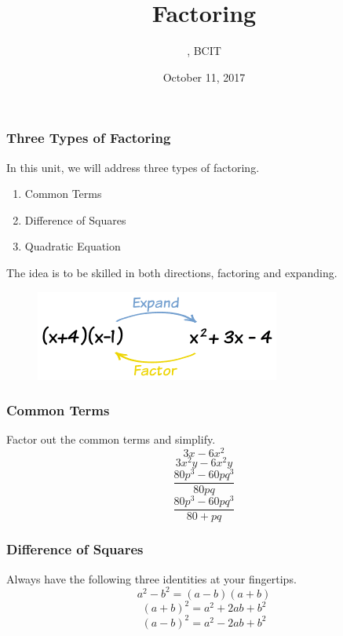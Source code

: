 \documentclass[xcolor=dvipsnames]{beamer}
\title{Factoring}
\subtitle{{\CourseNumber}, BCIT}
\author{\CourseName}
\date{October 11, 2017}
\begin{document}
\begin{frame}
  \titlepage
\end{frame}

\begin{frame}
  \frametitle{Three Types of Factoring}
In this unit, we will address three types of factoring.
\begin{enumerate}
\item Common Terms
\item Difference of Squares
\item Quadratic Equation
\end{enumerate}
The idea is to be skilled in both directions, \alert{factoring} and
\alert{expanding}.
  \begin{figure}[h]
    \includegraphics[scale=1]{./factorexpand.png}
  \end{figure}
\end{frame}

\begin{frame}
  \frametitle{Common Terms}
Factor out the common terms and simplify.
\begin{equation}
  \label{eq:yohpeumo}
3x-6x^{2}  
\end{equation}
\begin{equation}
  \label{eq:eeviewie}
  3x^{2}y-6x^{2}y
\end{equation}
\begin{equation}
  \label{eq:eewahque}
  \frac{80p^{3}-60pq^{3}}{80pq}
\end{equation}
\begin{equation}
  \label{eq:seeyeede}
  \frac{80p^{3}-60pq^{3}}{80+pq}
\end{equation}
\end{frame}

\begin{frame}
  \frametitle{Difference of Squares}
Always have the following three identities at your fingertips.
\begin{equation}
  \label{eq:ooheetae}
  a^{2}-b^{2}=(a-b)(a+b)
\end{equation}
\begin{equation}
  \label{eq:phiecief}
  (a+b)^{2}=a^{2}+2ab+b^{2}
\end{equation}
\begin{equation}
  \label{eq:aingaixo}
  (a-b)^{2}=a^{2}-2ab+b^{2}
\end{equation}
\end{frame}
\end{document}
